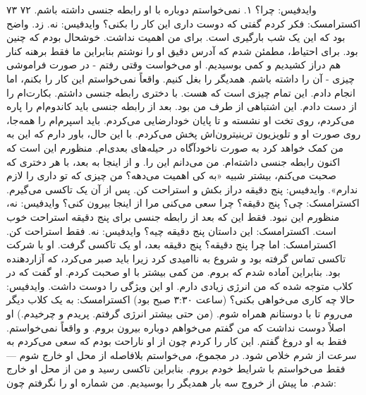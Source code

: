 ۷۳  
۷۲  
وایدفیس: چرا؟ ۱. نمی‌خواستم دوباره با او رابطه جنسی داشته باشم.  
اکسترامسک: فکر کردم گفتی که دوست داری این کار را بکنی؟  
وایدفیس: نه. زد. واضح بود که این یک شب بارگیری است.  
برای من اهمیت نداشت. خوشحال بودم که چنین بود. برای احتیاط، مطمئن شدم که آدرس دقیق او را نوشتم  
بنابراین ما فقط برهنه کنار هم دراز کشیدیم و کمی بوسیدیم. او می‌خواست وقتی رفتم - در صورت فراموشی چیزی - آن را داشته باشم.  
همدیگر را بغل کنیم. واقعاً نمی‌خواستم این کار را بکنم، اما انجام دادم. این تمام چیزی است که هست. با دختری رابطه جنسی داشتم. بکارت‌ام را از دست دادم.  
این اشتباهی از طرف من بود. بعد از رابطه جنسی باید کاندوم‌ام را پاره می‌کردم،  
روی تخت او نشسته و تا پایان خودارضایی می‌کردم. باید اسپرم‌ام را همه‌جا، روی صورت او و تلویزیون ترینیترون‌اش پخش می‌کردم.  
با این حال، باور دارم که این به من کمک خواهد کرد به صورت ناخودآگاه در حیله‌های بعدی‌ام. منظورم این است که اکنون رابطه جنسی داشته‌ام. من می‌دانم این را.  
و از اینجا به بعد، با هر دختری که صحبت می‌کنم، بیشتر شبیه «به کی اهمیت می‌دهه؟ من چیزی که تو داری را لازم ندارم».  
وایدفیس: پنج دقیقه دراز بکش و استراحت کن. پس از آن یک تاکسی می‌گیرم.  
اکسترامسک: چی؟ پنج دقیقه؟ چرا سعی می‌کنی مرا از اینجا بیرون کنی؟  
وایدفیس: نه، منظورم این نبود. فقط این که بعد از رابطه جنسی برای پنج دقیقه استراحت خوب است.  
اکسترامسک: این داستان پنج دقیقه چیه؟  
وایدفیس: نه. فقط استراحت کن.  
اکسترامسک: اما چرا پنج دقیقه؟  
پنج دقیقه بعد، او یک تاکسی گرفت. او با شرکت تاکسی تماس گرفته بود  
و شروع به ناامیدی کرد زیرا باید صبر می‌کرد، که آزاردهنده بود. بنابراین آماده شدم که بروم.  
من کمی بیشتر با او صحبت کردم. او گفت که در کلاب متوجه شده که من انرژی زیادی دارم. او این ویژگی را دوست داشت.  
وایدفیس: حالا چه کاری می‌خواهی بکنی؟ (ساعت ۳:۳۰ صبح بود)  
اکسترامسک: به یک کلاب دیگر می‌روم تا با دوستانم همراه شوم. (من حتی بیشتر انرژی گرفتم. پریدم و چرخیدم.)  
او اصلاً دوست نداشت که من گفتم می‌خواهم دوباره بیرون بروم. و واقعاً نمی‌خواستم.  
فقط به او دروغ گفتم. این کار را کردم چون از او ناراحت بودم که سعی می‌کردم به سرعت از شرم خلاص شود.  
در مجموع، می‌خواستم بلافاصله از محل او خارج شوم — فقط می‌خواستم با شرایط خودم بروم.  
بنابراین تاکسی رسید و من از محل او خارج شدم. ما پیش از خروج سه بار همدیگر را بوسیدیم.  
من شماره او را نگرفتم چون:  

